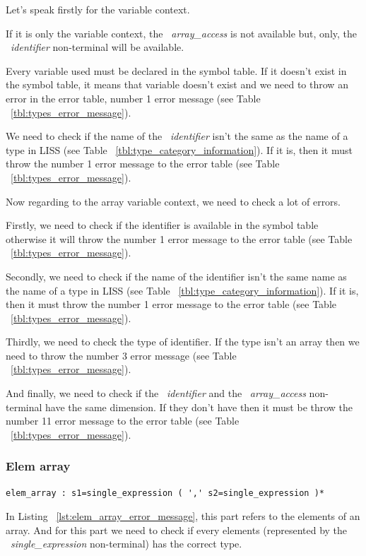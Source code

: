 \documentclass[
  oneside,
  11pt, a4paper,
  footinclude=true,
  headinclude=true,
  cleardoublepage=empty
]{scrbook}
\begin{document}
Let's speak firstly for the variable context.

If it is only the variable context, the ~\textit{array\_access} is not available but, only, the ~\textit{identifier} non-terminal will be available.

Every variable used must be declared in the symbol table. If it doesn't exist in the symbol table, it means that variable doesn't exist and we need to throw an error in the error table, number 1 error message (see Table ~\ref{tbl:types_error_message}).

We need to check if the name of the ~\textit{identifier} isn't the same as the name of a type in LISS (see Table ~\ref{tbl:type_category_information}). If it is, then it must throw the number 1 error message to the error table (see Table ~\ref{tbl:types_error_message}).

Now regarding to the array variable context, we need to check a lot of errors.

Firstly, we need to check if the identifier is available in the symbol table otherwise it will throw the number 1 error message to the error table (see Table ~\ref{tbl:types_error_message}).
 
Secondly, we need to check if the name of the identifier isn't the same name as the name of a type in LISS (see Table ~\ref{tbl:type_category_information}). If it is, then it must throw the number 1 error message to the error table (see Table ~\ref{tbl:types_error_message}).

Thirdly, we need to check the type of identifier. If the type isn't an array then we need to throw the number 3 error message (see Table ~\ref{tbl:types_error_message}).

And finally, we need to check if the ~\textit{identifier} and the ~\textit{array\_access} non-terminal have the same dimension. If they don't have then it must be throw the number 11 error message to the error table (see Table ~\ref{tbl:types_error_message}).

\subsubsection{Elem array}

\begin{lstlisting}[caption={Elem\_array rule in LISS},label={lst:elem_array_error_message}]
  elem_array : s1=single_expression ( ',' s2=single_expression )*
\end{lstlisting}

In Listing ~\ref{lst:elem_array_error_message}, this part refers to the elements of an array.
And for this part we need to check if every elements (represented by the ~\textit{single\_expression} non-terminal) has the correct type.
\end{document}
